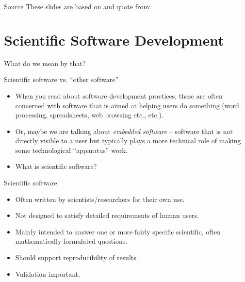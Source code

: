 \documentclass[english]{beamer}
\newcommand{\sectionslide}{\centering\vspace*{25mm}%
  {\bfseries\LARGE \insertsection}}
\begin{document}

\begin{frame}{\insertsection}{Source}
  These slides are based on and quote from:
  \begin{center}
    \printbibliography
  \end{center}
\end{frame}



\section{Scientific Software Development}

\begin{frame}
  \sectionslide
\end{frame}


\begin{frame}{\insertsection}{What do we mean by that?}
  \begin{block}{Scientific software vs. ``other software''}
    \begin{itemize}
    \item When you read about software development practices, these
      are often concerned with software that is aimed at helping users
      do something (word processing, spreadsheets, web browsing etc.,
      etc.).
    \item Or, maybe we are talking about \emph{embedded software} --
      software that is not directly visible to a user but typically
      plays a more technical role of making some technological
      ``apparatus'' work.
    \item What is scientific software?
    \end{itemize}
  \end{block}
\end{frame}


\begin{frame}{\insertsection}
  \begin{block}{Scientific software}
    \begin{itemize}
    \item Often written by scientists/researchers for their own use.
    \item Not designed to satisfy detailed requirements of human
      users.
    \item Mainly intended to answer one or more fairly specific
      scientific, often mathematically formulated questions.
    \item Should support reproducibility of results.
    \item Validation important.
    \end{itemize}
  \end{block}
\end{frame}
\end{document}
